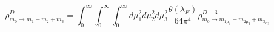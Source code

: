 \begin{equation}
 \rho^{D}_{m_0\rightarrow m_1\!+m_2\!+m_3}\!=\!\int_0^\infty\!\!\int_0^\infty\!
 \!\int_0^\infty d\mu_1^2d\mu_2^2d\mu_3^2 \frac{\theta(\lambda_E)}{64\pi^4}
 \rho^{D-3}_{m_0\rightarrow m_{1\mu_1}\!+m_{2\mu_2}\!+m_{3\mu_3}}
\end{equation}

